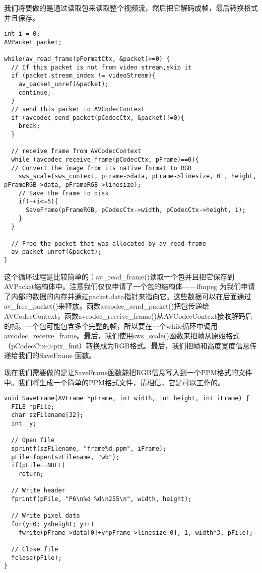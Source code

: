 我们将要做的是通过读取包来读取整个视频流，然后把它解码成帧，最后转换格式并且保存。
\begin{lstlisting}
int i = 0;
AVPacket packet;

while(av_read_frame(pFormatCtx, &packet)>=0) {
  // If this packet is not from video stream,skip it
  if (packet.stream_index != videoStream){
    av_packet_unref(&packet);
    continue;
  }
  // send this packet to AVCodecContext
  if (avcodec_send_packet(pCodecCtx, &packet)!=0){
    break;
  }

  // receive frame from AVCodecContext
  while (avcodec_receive_frame(pCodecCtx, pFrame)==0){
  // Convert the image from its native format to RGB
    sws_scale(sws_context, pFrame->data, pFrame->linesize, 0 , height, pFrameRGB->data, pFrameRGB->linesize);
    // Save the frame to disk
    if(++i<=5){
      SaveFrame(pFrameRGB, pCodecCtx->width, pCodecCtx->height, i);
    }
  }

  // Free the packet that was allocated by av_read_frame
  av_packet_unref(&packet);
}
\end{lstlisting}



这个循环过程是比较简单的：av_read_frame()读取一个包并且把它保存到AVPacket结构体中。注意我们仅仅申请了一个包的结构体——ffmpeg 为我们申请了内部的数据的内存并通过packet.data指针来指向它。这些数据可以在后面通过av_free_packet()来释放。函数avcodec_send_packet()把包传递给AVCodecContext，函数avcodec_receive_frame()从AVCodecContext接收解码后的帧。一个包可能包含多个完整的帧，所以要在一个while循环中调用avcodec_receive_frame。最后，我们使用sws_scale()函数来把帧从原始格式（pCodecCtx->pix_fmt）转换成为RGB格式。最后，我们把帧和高度宽度信息传递给我们的SaveFrame 函数。

现在我们需要做的是让SaveFrame函数能把RGB信息写入到一个PPM格式的文件中。我们将生成一个简单的PPM格式文件，请相信，它是可以工作的。

\begin{lstlisting}
void SaveFrame(AVFrame *pFrame, int width, int height, int iFrame) {
  FILE *pFile;
  char szFilename[32];
  int  y;

  // Open file
  sprintf(szFilename, "frame%d.ppm", iFrame);
  pFile=fopen(szFilename, "wb");
  if(pFile==NULL)
    return;

  // Write header
  fprintf(pFile, "P6\n%d %d\n255\n", width, height);

  // Write pixel data
  for(y=0; y<height; y++)
    fwrite(pFrame->data[0]+y*pFrame->linesize[0], 1, width*3, pFile);

  // Close file
  fclose(pFile);
}
\end{lstlisting}

